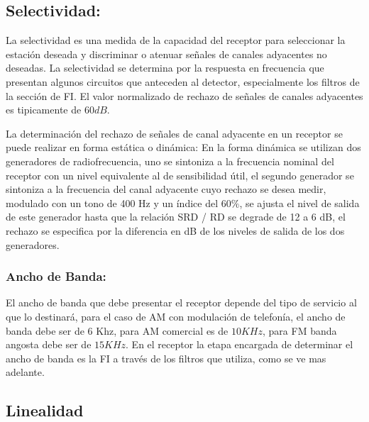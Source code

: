 \documentclass[letterpaper,10pt,spanish]{sphinxmanual}
\let\sphinxpxdimen\pdfpxdimen\else\newdimen\sphinxpxdimen
\begin{document}
\subsection{Selectividad:}
\label{\detokenize{introduccion/sistemas:Selectividad:}}
La selectividad es una medida de la capacidad del receptor para seleccionar la estación deseada y discriminar o atenuar señales de canales adyacentes no deseadas. La selectividad se determina por la respuesta en frecuencia que presentan algunos circuitos que anteceden al detector, especialmente los filtros de la sección de FI. El valor normalizado de rechazo de señales de canales adyacentes es tipicamente de \(60 dB\).

\sphinxincludegraphics[width=1300\sphinxpxdimen,height=875\sphinxpxdimen]{{selectividad}.png}

La determinación del rechazo de señales de canal adyacente en un receptor se puede realizar en forma estática o dinámica: En la forma dinámica se utilizan dos generadores de radiofrecuencia, uno se sintoniza a la frecuencia nominal del receptor con un nivel equivalente al de sensibilidad útil, el segundo generador se sintoniza a la frecuencia del canal adyacente cuyo rechazo se desea medir, modulado con un tono de 400 Hz y un índice del \(60\%\), se ajusta el nivel de salida de este
generador hasta que la relación SRD / RD se degrade de 12 a 6 dB, el rechazo se especifica por la diferencia en dB de los niveles de salida de los dos generadores.

\sphinxincludegraphics[width=1167\sphinxpxdimen,height=867\sphinxpxdimen]{{selectividad2}.png}


\subsubsection{Ancho de Banda:}
\label{\detokenize{introduccion/sistemas:Ancho-de-Banda:}}
El ancho de banda que debe presentar el receptor depende del tipo de servicio al que lo destinará, para el caso de AM con modulación de telefonía, el ancho de banda debe ser de 6 Khz, para AM comercial es de \(10 KHz\), para FM banda angosta debe ser de \(15 KHz\). En el receptor la etapa encargada de determinar el ancho de banda es la FI a través de los filtros que utiliza, como se ve mas adelante.


\subsection{Linealidad}
\label{\detokenize{introduccion/sistemas:Linealidad}}
\end{document}
